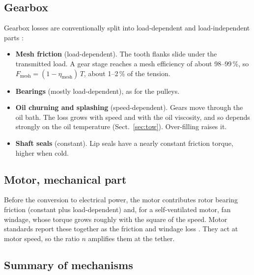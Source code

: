 \documentclass[11pt,a4paper]{article}
\begin{document}
\subsection{Gearbox}
Gearbox losses are conventionally split into load-dependent and
load-independent parts \cite{iso14179}:
\begin{itemize}
  \item \textbf{Mesh friction} (load-dependent). The tooth flanks slide under
    the transmitted load. A gear stage reaches a mesh efficiency of about
    98--99\,\%, so $F_\mathrm{mesh} = (1-\eta_\mathrm{mesh})\,T$, about
    1--2\,\% of the tension.
  \item \textbf{Bearings} (mostly load-dependent), as for the pulleys.
  \item \textbf{Oil churning and splashing} (speed-dependent). Gears move
    through the oil bath. The loss grows with speed and with the oil viscosity,
    and so depends strongly on the oil temperature (Sect.~\ref{sec:tow}).
    Over-filling raises it.
  \item \textbf{Shaft seals} (constant). Lip seals have a nearly constant
    friction torque, higher when cold.
\end{itemize}

\subsection{Motor, mechanical part}
Before the conversion to electrical power, the motor contributes rotor bearing
friction (constant plus load-dependent) and, for a self-ventilated motor, fan
windage, whose torque grows roughly with the square of the speed. Motor
standards report these together as the friction and windage loss
\cite{iec60034}. They act at motor speed, so the ratio $n$ amplifies them at
the tether.

\subsection{Summary of mechanisms}
\end{document}

